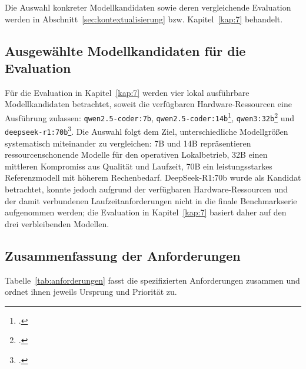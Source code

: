 Die Auswahl konkreter Modellkandidaten sowie deren vergleichende Evaluation werden in Abschnitt~\ref{sec:kontextualisierung} bzw. Kapitel~\ref{kap:7} behandelt.

\subsection{Ausgewählte Modellkandidaten für die Evaluation}

Für die Evaluation in Kapitel~\ref{kap:7} werden vier lokal ausführbare Modellkandidaten betrachtet, soweit die verfügbaren Hardware-Ressourcen eine Ausführung zulassen: \texttt{qwen2.5-coder:7b}, \texttt{qwen2.5-coder:14b}\footcite[Vgl.][]{hui2024qwen25coder}, \texttt{qwen3:32b}\footcite[Vgl.][]{qwen3} und \texttt{deepseek-r1:70b}\footcite[Vgl.][]{deepseek}. Die Auswahl folgt dem Ziel, unterschiedliche Modellgrößen systematisch miteinander zu vergleichen: 7B und 14B repräsentieren ressourcenschonende Modelle für den operativen Lokalbetrieb, 32B einen mittleren Kompromiss aus Qualität und Laufzeit, 70B ein leistungsstarkes Referenzmodell mit höherem Rechenbedarf. DeepSeek-R1:70b wurde als Kandidat betrachtet, konnte jedoch aufgrund der verfügbaren Hardware-Ressourcen und der damit verbundenen Laufzeitanforderungen nicht in die finale Benchmarkserie aufgenommen werden; die Evaluation in Kapitel~\ref{kap:7} basiert daher auf den drei verbleibenden Modellen.

\subsection{Zusammenfassung der Anforderungen}

Tabelle~\ref{tab:anforderungen} fasst die spezifizierten Anforderungen zusammen und ordnet ihnen jeweils Ursprung und Priorität zu.


